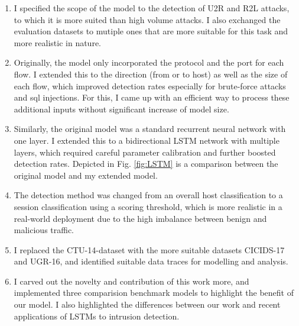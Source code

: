 \documentclass[a4paper,12pt,twoside]{article}
\begin{document}
\begin{enumerate}
\item I specified the scope of the model to the detection of U2R and R2L attacks, to which it is more suited than high volume attacks. I also exchanged the evaluation datasets to mutiple ones that are more suitable for this task and more realistic in nature.
\item Originally, the model only incorporated the protocol and the port for each flow. I extended this to the direction (from or to host) as well as the size of each flow, which improved detection rates especially for brute-force attacks and sql injections. For this, I came up with an efficient way to process these additional inputs without significant increase of model size.
\item Similarly, the original model was a standard recurrent neural network with one layer. I extended this to a bidirectional LSTM network with multiple layers, which required careful parameter calibration and further boosted detection rates. Depicted in Fig. \ref{fig:LSTM} is a comparison between the original model and my extended model.
\item The detection method was changed from an overall host classification to a session classification using a scoring threshold, which is more realistic in a real-world deployment due to the high imbalance between benign and malicious traffic.
\item I replaced the CTU-14-dataset with the more suitable datasets CICIDS-17 and UGR-16, and identified suitable data traces for modelling and analysis. 
\item I carved out the novelty and contribution of this work more, and implemented three comparision benchmark models to highlight the benefit of our model. I also highlighted the differences between our work and recent applications of LSTMs to intrusion detection.
\end{enumerate}
\end{document}

